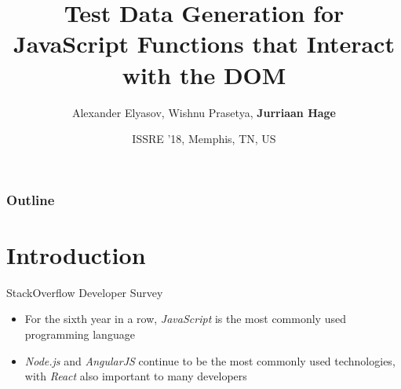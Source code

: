 \documentclass{beamer}
\title[ISSRE]{Test Data Generation for JavaScript Functions that Interact with the DOM}
\author[Elyasov et al.]{Alexander Elyasov, Wishnu Prasetya, \textbf{Jurriaan Hage}}
\institute[Universities Utrecht and Valencia]{
Utrecht University, The Netherlands \\ \texttt{alex.elyasov@gmail.com}
}
\date[ISSRE '18]{ISSRE '18, Memphis, TN, US}
\begin{document}
\frontmatter

\begin{frame}
  \titlepage
\end{frame}

\mainmatter

\begin{frame}
  \frametitle{Outline}
  \tableofcontents
\end{frame}


\section{Introduction}

\begin{frame}{StackOverflow Developer Survey}

  \footnotesize
  \begin{itemize}
    \item For the sixth year in a row, \emph{JavaScript} is the most commonly used programming language
    \item \emph{Node.js} and \emph{AngularJS} continue to be the most commonly used technologies, with \emph{React} also important to many developers
  \end{itemize}  

  \begin{columns}
    

\end{columns}
\end{frame}
\end{document}

